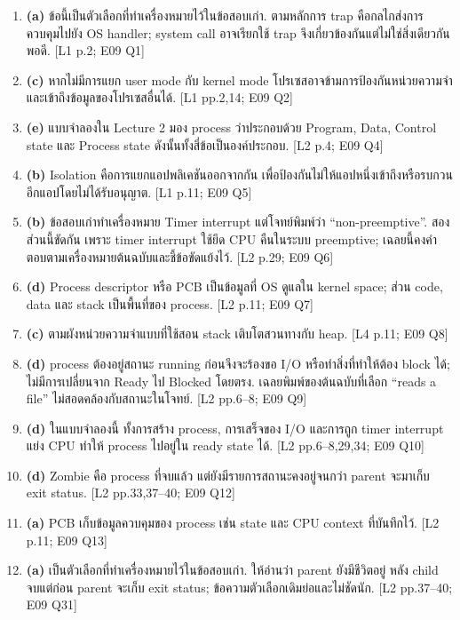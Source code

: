 \begin{enumerate}[leftmargin=1.4em,start=1,itemsep=0.14cm]
\item \textbf{(a)} ข้อนี้เป็นตัวเลือกที่ทำเครื่องหมายไว้ในข้อสอบเก่า. ตามหลักการ trap คือกลไกส่งการควบคุมไปยัง OS handler; system call อาจเรียกใช้ trap จึงเกี่ยวข้องกันแต่ไม่ใช่สิ่งเดียวกันพอดี. {\small [L1 p.2; E09 Q1]}
\item \textbf{(c)} หากไม่มีการแยก user mode กับ kernel mode โปรเซสอาจข้ามการป้องกันหน่วยความจำและเข้าถึงข้อมูลของโปรเซสอื่นได้. {\small [L1 pp.2,14; E09 Q2]}
\item \textbf{(e)} แบบจำลองใน Lecture 2 มอง process ว่าประกอบด้วย Program, Data, Control state และ Process state ดังนั้นทั้งสี่ข้อเป็นองค์ประกอบ. {\small [L2 p.4; E09 Q4]}
\item \textbf{(b)} Isolation คือการแยกแอปพลิเคชันออกจากกัน เพื่อป้องกันไม่ให้แอปหนึ่งเข้าถึงหรือรบกวนอีกแอปโดยไม่ได้รับอนุญาต. {\small [L1 p.11; E09 Q5]}
\item \textbf{(b)} ข้อสอบเก่าทำเครื่องหมาย Timer interrupt แต่โจทย์พิมพ์ว่า ``non-preemptive''. สองส่วนนี้ขัดกัน เพราะ timer interrupt ใช้ยึด CPU คืนในระบบ preemptive; เฉลยนี้คงคำตอบตามเครื่องหมายต้นฉบับและชี้ข้อขัดแย้งไว้. {\small [L2 p.29; E09 Q6]}
\item \textbf{(d)} Process descriptor หรือ PCB เป็นข้อมูลที่ OS ดูแลใน kernel space; ส่วน code, data และ stack เป็นพื้นที่ของ process. {\small [L2 p.11; E09 Q7]}
\item \textbf{(c)} ตามผังหน่วยความจำแบบที่ใช้สอน stack เติบโตสวนทางกับ heap. {\small [L4 p.11; E09 Q8]}
\item \textbf{(d)} process ต้องอยู่สถานะ running ก่อนจึงจะร้องขอ I/O หรือทำสิ่งที่ทำให้ต้อง block ได้; ไม่มีการเปลี่ยนจาก Ready ไป Blocked โดยตรง. เฉลยพิมพ์ของต้นฉบับที่เลือก ``reads a file'' ไม่สอดคล้องกับสถานะในโจทย์. {\small [L2 pp.6--8; E09 Q9]}
\item \textbf{(d)} ในแบบจำลองนี้ ทั้งการสร้าง process, การเสร็จของ I/O และการถูก timer interrupt แย่ง CPU ทำให้ process ไปอยู่ใน ready state ได้. {\small [L2 pp.6--8,29,34; E09 Q10]}
\item \textbf{(d)} Zombie คือ process ที่จบแล้ว แต่ยังมีรายการสถานะคงอยู่จนกว่า parent จะมาเก็บ exit status. {\small [L2 pp.33,37--40; E09 Q12]}
\item \textbf{(a)} PCB เก็บข้อมูลควบคุมของ process เช่น state และ CPU context ที่บันทึกไว้. {\small [L2 p.11; E09 Q13]}
\item \textbf{(a)} เป็นตัวเลือกที่ทำเครื่องหมายไว้ในข้อสอบเก่า. ให้อ่านว่า parent ยังมีชีวิตอยู่ หลัง child จบแต่ก่อน parent จะเก็บ exit status; ข้อความตัวเลือกเดิมย่อและไม่ชัดนัก. {\small [L2 pp.37--40; E09 Q31]}

\end{enumerate}
